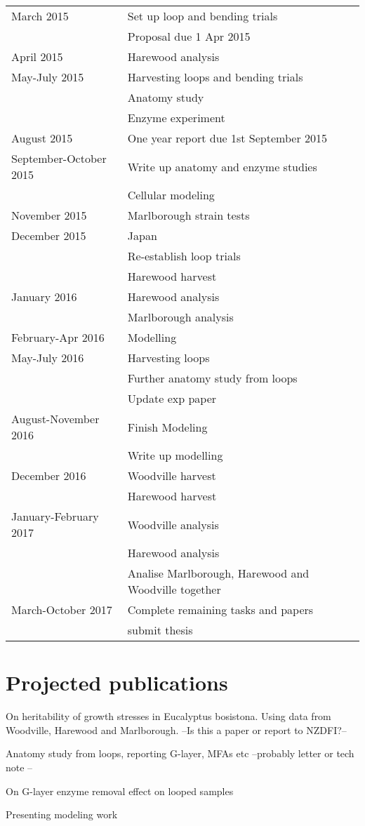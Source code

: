 \documentclass{article}
\begin{document}
\begin{tabular}{ l l }
\hline
  March 2015 & Set up loop and bending trials \\
   & Proposal due 1 Apr 2015 \\
   \hline
  April 2015 & Harewood analysis \\
  \hline
  May-July 2015 & Harvesting loops and bending trials \\
  & Anatomy study\\
  & Enzyme experiment\\
  \hline
  August 2015 & One year report due 1st September 2015\\
  \hline
  September-October 2015&Write up anatomy and enzyme studies\\
  &Cellular modeling\\
  \hline
  November 2015&Marlborough strain tests\\
  \hline
  December 2015 & Japan \\
  &Re-establish loop trials\\
  & Harewood harvest\\
  \hline
  January 2016&Harewood analysis\\
  &Marlborough analysis\\
  \hline
  February-Apr 2016 & Modelling\\
  \hline
  May-July 2016&Harvesting loops\\
  &Further anatomy study from loops\\
  &Update exp paper\\
  \hline
  August-November 2016&Finish Modeling\\
  &Write up modelling\\
  \hline
  December 2016&Woodville harvest\\
  &Harewood harvest\\
  \hline
  January-February 2017&Woodville analysis\\
  &Harewood analysis\\
  &Analise Marlborough, Harewood and Woodville together\\
  \hline
  March-October 2017&Complete remaining tasks and papers\\
  &submit thesis\\
  \hline
\end{tabular}


\section{Projected publications}
On heritability of growth stresses in Eucalyptus bosistona. Using data from
Woodville, Harewood and Marlborough. --Is this a paper or report to NZDFI?--

Anatomy study from loops, reporting G-layer, MFAs etc --probably letter or tech
note --

On G-layer enzyme removal effect on looped samples

Presenting modeling work
\end{document}
